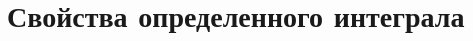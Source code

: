 \documentclass[../main.tex]{subfiles}
\begin{document}
\chapter{Свойства определенного интеграла}


\end{document}
